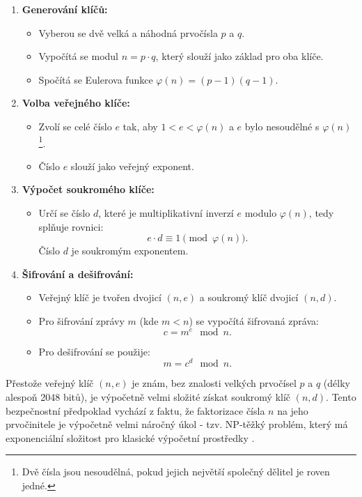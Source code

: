 \begin{enumerate}
  \item \textbf{Generování klíčů:}
    \begin{itemize}
      \item Vyberou se dvě velká a náhodná prvočísla \( p \) a \( q \).
      \item Vypočítá se modul \( n = p \cdot q \), který slouží jako základ pro oba klíče.
      \item Spočítá se Eulerova funkce \(\varphi(n) = (p-1)(q-1)\).
    \end{itemize}

  \item \textbf{Volba veřejného klíče:}
    \begin{itemize}
      \item Zvolí se celé číslo \( e \) tak, aby \( 1 < e < \varphi(n) \) a \( e \) bylo nesoudělné s \(\varphi(n)\)\footnote{Dvě čísla jsou nesoudělná, pokud jejich největší společný dělitel je roven jedné.}.
      \item Číslo \( e \) slouží jako veřejný exponent.
    \end{itemize}
  
  \item \textbf{Výpočet soukromého klíče:}
    \begin{itemize}
      \item Určí se číslo \( d \), které je multiplikativní inverzí \( e \) modulo \(\varphi(n)\), tedy splňuje rovnici:
      \[
      e \cdot d \equiv 1 \pmod{\varphi(n)}.
      \]
      Číslo \( d \) je soukromým exponentem.
    \end{itemize}
  
  \item \textbf{Šifrování a dešifrování:}
    \begin{itemize}
      \item Veřejný klíč je tvořen dvojicí \((n, e)\) a soukromý klíč dvojicí \((n, d)\).
      \item Pro šifrování zprávy \( m \) (kde \( m < n \)) se vypočítá šifrovaná zpráva:
      \[
      c = m^e \mod n.
      \]
      \item Pro dešifrování se použije:
      \[
      m = c^d \mod n.
      \]
    \end{itemize}
\end{enumerate}

Přestože veřejný klíč \((n, e)\) je znám, bez znalosti velkých prvočísel \( p \) a \( q \) (délky alespoň 2048 bitů), je výpočetně velmi složité získat soukromý klíč \((n, d)\). Tento bezpečnostní předpoklad vychází z faktu, že faktorizace čísla \( n \) na jeho prvočinitele je výpočetně velmi náročný úkol - tzv. NP-těžký problém, který má exponenciální složitost pro klasické výpočetní prostředky \parencite{tesar2021}.  

